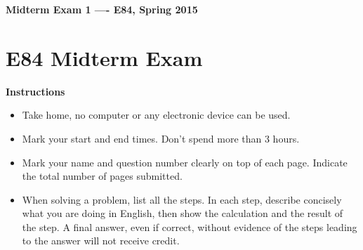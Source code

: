 \documentclass[12pt]{article}
\begin{document}
\begin{center}
{\Large \bf  Midterm Exam 1 ---- E84, Spring 2015}
\end{center}

\section*{E84 Midterm Exam}

{\bf Instructions}
\begin{itemize}
\item Take home, no computer or any electronic device can be used.
\item Mark your start and end times. Don't spend more than 3 hours.
\item Mark your name and question number clearly on top of each page.
	Indicate the total number of pages submitted.
\item When solving a problem, list all the steps. In each step, describe 
	concisely what you are doing in English, then show the calculation 
	and the result of the step. A final answer, even if correct, without 
	evidence of the steps leading to the answer will not receive credit.
\end{itemize}
\end{document}
